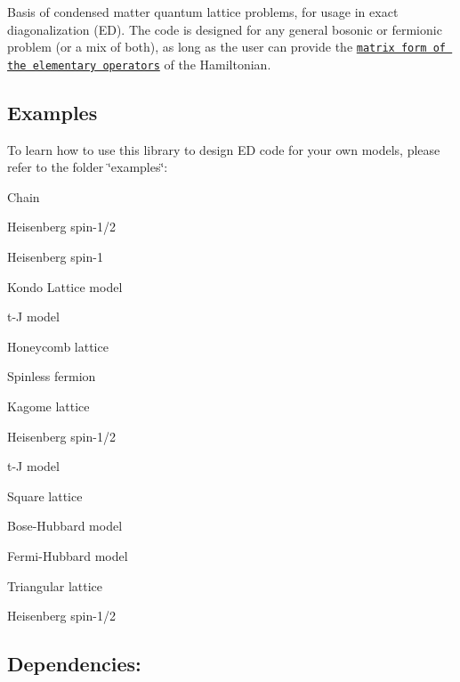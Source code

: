 Basis of condensed matter quantum lattice problems, for usage in exact diagonalization (ED). The code is designed for any general bosonic or fermionic problem (or a mix of both), as long as the user can provide the \href{Manual.pdf}{\tt matrix form of the elementary operators} of the Hamiltonian.

\subsection*{Examples}

To learn how to use this library to design ED code for your own models, please refer to the folder \char`\"{}examples\char`\"{}\+:
\begin{DoxyItemize}
\item Chain
\begin{DoxyItemize}
\item Heisenberg spin-\/1/2
\item Heisenberg spin-\/1
\item Kondo Lattice model
\item t-\/J model
\end{DoxyItemize}
\item Honeycomb lattice
\begin{DoxyItemize}
\item Spinless fermion
\end{DoxyItemize}
\item Kagome lattice
\begin{DoxyItemize}
\item Heisenberg spin-\/1/2
\item t-\/J model
\end{DoxyItemize}
\item Square lattice
\begin{DoxyItemize}
\item Bose-\/\+Hubbard model
\item Fermi-\/\+Hubbard model
\end{DoxyItemize}
\item Triangular lattice
\begin{DoxyItemize}
\item Heisenberg spin-\/1/2
\end{DoxyItemize}
\end{DoxyItemize}

\subsection*{Dependencies\+:}


